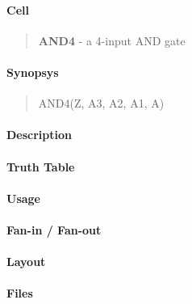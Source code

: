 \label{AND4}
\paragraph{Cell}
\begin{quote}
    \textbf{AND4} - a 4-input AND gate
\end{quote}

\paragraph{Synopsys}
\begin{quote}
    AND4(Z, A3, A2, A1, A)
\end{quote}

\paragraph{Description}



\paragraph{Truth Table}


\paragraph{Usage}

\paragraph{Fan-in / Fan-out}

\paragraph{Layout}

\paragraph{Files}

\clearpage

